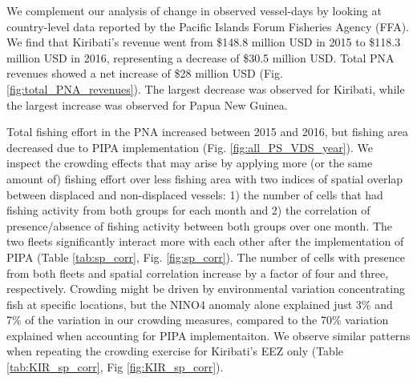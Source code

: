 \documentclass[12pt]{article}
\begin{document}
We complement our analysis of change in observed vessel-days by looking at country-level data reported by the Pacific Islands Forum Fisheries Agency (FFA). We find that Kiribati's revenue went from \$148.8 million USD in 2015 to \$118.3 million USD in 2016, representing a decrease of \$30.5 million USD. Total PNA revenues showed a net increase of \$28 million USD (Fig. \ref{fig:total_PNA_revenues}). The largest decrease was observed for Kiribati, while the largest increase was observed for Papua New Guinea.

Total fishing effort in the PNA increased between 2015 and 2016, but fishing area decreased due to PIPA implementation (Fig. \ref{fig:all_PS_VDS_year}). We inspect the crowding effects that may arise by applying more (or the same amount of) fishing effort over less fishing area with two indices of spatial overlap between displaced and non-displaced vessels: 1) the number of cells that had fishing activity from both groups for each month and 2) the correlation of presence/absence of fishing activity between both groups over one month. The two fleets significantly interact more with each other after the implementation of PIPA (Table \ref{tab:sp_corr}, Fig. \ref{fig:sp_corr}). The number of cells with presence from both fleets and spatial correlation increase by a factor of four and three, respectively. Crowding might be driven by environmental variation concentrating fish at specific locations, but the NINO4 anomaly alone explained just 3\% and 7\% of the variation in our crowding measures, compared to the 70\% variation explained when accounting for PIPA implementaiton. We observe similar patterns when repeating the crowding exercise for Kiribati's EEZ only (Table \ref{tab:KIR_sp_corr}, Fig \ref{fig:KIR_sp_corr}).
\end{document}
